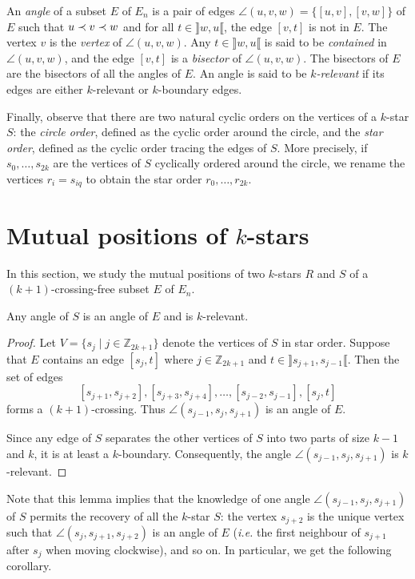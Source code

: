 \documentclass[12pt]{amsart}
\begin{document}
An \emph{angle} of a subset $E$ of $E_n$ is a pair of edges $\angle(u,v,w)=\{[u,v],[v,w]\}$ of $E$ such that $u\prec v\prec w$ and for all $t\in\rrbracket w,u\llbracket$, the edge $[v,t]$ is not in $E$. The vertex $v$ is the \emph{vertex} of $\angle(u,v,w)$. Any $t\in\rrbracket w,u\llbracket$ is said to be \emph{contained} in $\angle(u,v,w)$, and the edge $[v,t]$ is a \emph{bisector} of $\angle(u,v,w)$.
The bisectors of $E$ are the bisectors of all the angles of $E$.
An angle is said to be \emph{$k$-relevant} if its edges are either $k$-relevant or $k$-boundary edges.

Finally, observe that there are two natural cyclic orders on the vertices of a $k$-star $S$: the \emph{circle order}, defined as the cyclic order around the circle, and the \emph{star order}, defined as the cyclic order tracing the edges of $S$. More precisely, if $s_0,\ldots,s_{2k}$ are the vertices of $S$ cyclically ordered around the circle, we rename the vertices $r_i=s_{iq}$ to obtain the star order $r_0,\ldots,r_{2k}$.




\section{Mutual positions of $k$-stars}\label{sectionstars}

In this section, we study the mutual positions of two $k$-stars $R$ and $S$ of a $(k+1)$-crossing-free subset $E$ of $E_n$.

\begin{lemma}\label{starangles}
Any angle of $S$ is an angle of $E$ and is $k$-relevant.
\end{lemma}

\begin{proof}
Let $V=\{s_j\;|\; j\in\mathbb{Z}_{2k+1}\}$ denote the vertices of $S$ in star order.
Suppose that $E$ contains an edge $[s_j,t]$ where $j\in\mathbb{Z}_{2k+1}$ and $t\in\rrbracket s_{j+1},s_{j-1}\llbracket$. Then the set of edges $$[s_{j+1},s_{j+2}],[s_{j+3},s_{j+4}],\ldots,[s_{j-2},s_{j-1}],[s_j,t]$$ forms a $(k+1)$-crossing. Thus $\angle(s_{j-1},s_j,s_{j+1})$ is an angle of $E$.

Since any edge of $S$ separates the other vertices of $S$ into two parts of size $k-1$ and $k$, it is at least a $k$-boundary. Consequently, the angle $\angle(s_{j-1},s_j,s_{j+1})$ is $k$-relevant.
\end{proof}

Note that this lemma implies that the knowledge of one angle $\angle(s_{j-1},s_j,s_{j+1})$ of $S$ permits the recovery of all the $k$-star $S$: the vertex $s_{j+2}$ is the unique vertex such that $\angle(s_j,s_{j+1},s_{j+2})$ is an angle of $E$ ({\it i.e.} the first neighbour of $s_{j+1}$ after $s_j$ when moving clockwise), and so on.
In particular, we get the following corollary.
\end{document}
